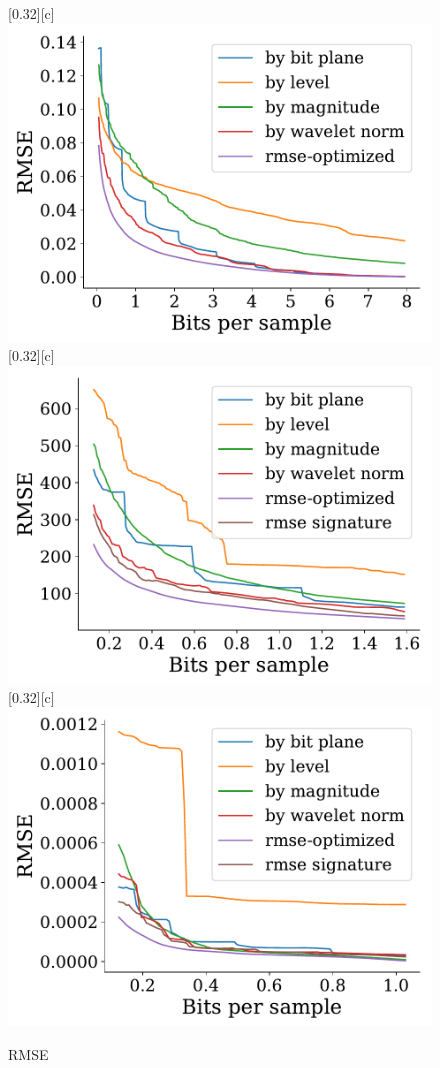 \documentclass{article}
\begin{document}
\begin{figure}[htb]
        [0.32\linewidth][c]{%
               \includegraphics[width=0.3\linewidth]{img/supplementary/rmse-optimized-enzo-v}}
        [0.32\linewidth][c]{%
               \includegraphics[width=0.3\linewidth]{img/supplementary/rmse-optimized-foam}}
        [0.32\linewidth][c]{%
                \includegraphics[width=0.3\linewidth]{img/supplementary/rmse-optimized-karfs}}
        \caption{RMSE}
\end{figure}
\end{document}
